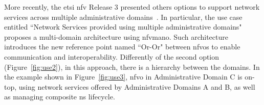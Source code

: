 More recently, the \gls{etsi} \gls{nfv} Release 3 presented others options to support network services across multiple administrative domains~\cite{ETSIGRDomains}. In particular, the use case entitled ``Network Services provided using multiple administrative domains" proposes a multi-domain architecture using \gls{nfvmano}. Such architecture introduces the new reference point named ``Or-Or" between \glspl{nfvo} to enable communication and interoperability. Differently of the second option (Figure~\ref{fig:use2}), in this approach, there is a hierarchy between the domains. In the example shown in Figure~\ref{fig:use3}, \gls{nfvo} in Administrative Domain C is on-top, using network services offered by Administrative Domains A and B, as well as managing composite \gls{ns} lifecycle.    

\begin{figure}[t!]
\centering
\end{figure}
